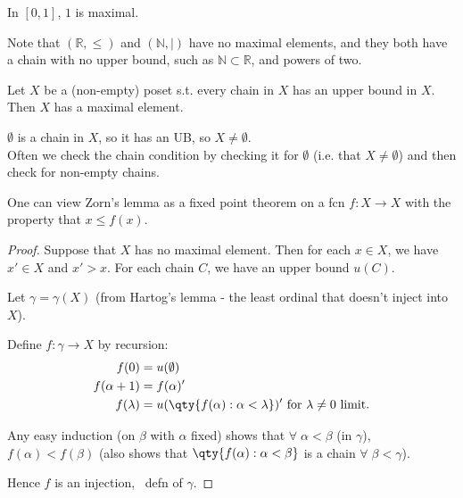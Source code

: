 \begin{example}
    In $[0,1]$, $1$ is maximal.
\end{example}

Note that $(\mathbb R, \leq)$ and $(\mathbb N, \mid)$ have no maximal elements, and they both have a chain with no upper bound, such as $\mathbb N \subset \mathbb R$, and powers of two.

\begin{theorem}
    Let $X$ be a (non-empty) poset s.t. every chain in $X$ has an upper bound in $X$.
    Then $X$ has a maximal element.
\end{theorem}

\begin{remark}
    $\emptyset$ is a chain in $X$, so it has an UB, so $X \neq \emptyset$. \\
    Often we check the chain condition by checking it for $\emptyset$ (i.e. that $X \neq \emptyset$) and then check for non-empty chains.
\end{remark}



One can view Zorn's lemma as a fixed point theorem on a fcn $f \colon X \to X$ with the property that $x \leq f(x)$.

\begin{proof}
    Suppose that $X$ has no maximal element.
    Then for each $x \in X$, we have $x' \in X$ and $x' > x$.
    For each chain $C$, we have an upper bound $u(C)$.

    Let $\gamma = \gamma(X)$ (from Hartog's lemma - the least ordinal that doesn't inject into $X$).

    Define $f : \gamma \to X$ by recursion:
    \begin{align*}
        f(0) &= u(\emptyset) \\
        f(\alpha + 1) &= f(\alpha)' \\
        f(\lambda) &= u(\qty{f(\alpha) : \alpha < \lambda})' \text{ for $\lambda \neq 0$ limit}.
    \end{align*}

    Any easy induction (on $\beta$ with $\alpha$ fixed) shows that $\forall \; \alpha < \beta$ (in $\gamma$), $f(\alpha) < f(\beta)$ (also shows that $\qty{f(\alpha) : \alpha < \beta}$ is a chain $\forall \; \beta < \gamma$).

    Hence $f$ is an injection, \Lightning \ defn of $\gamma$.
\end{proof}

